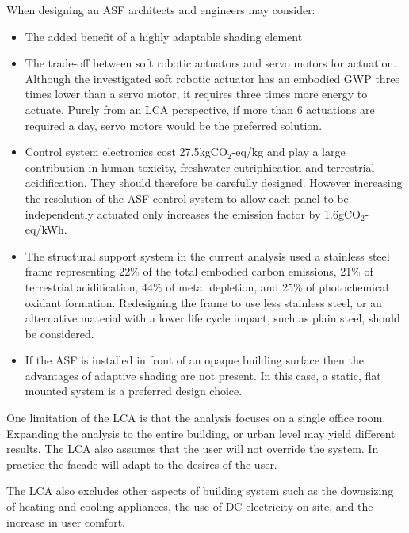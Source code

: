 When designing an ASF architects and engineers may consider: 
\begin{itemize}
\item The added benefit of a highly adaptable shading element
\item The trade-off between soft robotic actuators and servo motors for actuation. Although the investigated soft robotic actuator has an embodied GWP three times lower than a servo motor, it requires three times more energy to actuate. Purely from an LCA perspective, if more than 6 actuations are required a day, servo motors would be the preferred solution. 
\item Control system electronics cost 27.5kgCO$_{2}$-eq/kg and play a large contribution in human toxicity, freshwater eutriphication and terrestrial acidification. They should therefore be carefully designed. However increasing the resolution of the ASF control system to allow each panel to be independently actuated only increases the emission factor by 1.6gCO$_{2}$-eq/kWh.
\item The structural support system in the current analysis used a stainless steel frame representing 22\% of the total embodied carbon emissions, 21\% of terrestrial acidification, 44\% of metal depletion, and 25\% of photochemical oxidant formation. Redesigning the frame to use less stainless steel, or an alternative material with a lower life cycle impact, such as plain steel, should be considered.
\item If the ASF is installed in front of an opaque building surface then the advantages of adaptive shading are not present. In this case, a static, flat mounted system is a preferred design choice. 
\end{itemize}
 
One limitation of the LCA is that the analysis focuses on a single office room. Expanding the analysis to the entire building, or urban level may yield different results. The LCA also assumes that the user will not override the system. In practice the facade will adapt to the desires of the user. 

The LCA also excludes other aspects of building system such as the downsizing of heating and cooling appliances, the use of DC electricity on-site, and the increase in user comfort.

